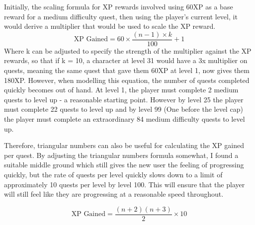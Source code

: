 Initially, the scaling formula for XP rewards involved using 60XP as a base reward for a medium difficulty quest, then using the player's current level, it would derive a multiplier that would be used to scale the XP reward.
\begin{equation} \label{eq:xpgainedlinear}
	\textrm{XP Gained} = 60 \times \frac{(n - 1) \times k}{100} + 1
\end{equation}
Where k can be adjusted to specify the strength of the multiplier against the XP rewards, so that if k = 10, a character at level 31 would have a 3x multiplier on quests, meaning the same quest that gave them 60XP at level 1, now gives them 180XP.
However, when modelling this equation, the number of quests completed quickly becomes out of hand. 
At level 1, the player must complete 2 medium quests to level up - a reasonable starting point.
However by level 25 the player must complete 22 quests to level up and by level 99 (One before the level cap) the player must complete an extraordinary 84 medium difficulty quests to level up.

Therefore, triangular numbers can also be useful for calculating the XP gained per quest. By adjusting the triangular numbers formula somewhat, I found a suitable middle ground which still gives the new user the feeling of progressing quickly, but the rate of quests per level quickly slows down to a limit of approximately 10 quests per level by level 100.
This will ensure that the player will still feel like they are progressing at a reasonable speed throughout.

\begin{equation} \label{eq:xpgainedtriangular}
	\textrm{XP Gained} = \frac{(n+2)(n+3)}{2} \times 10
\end{equation}




